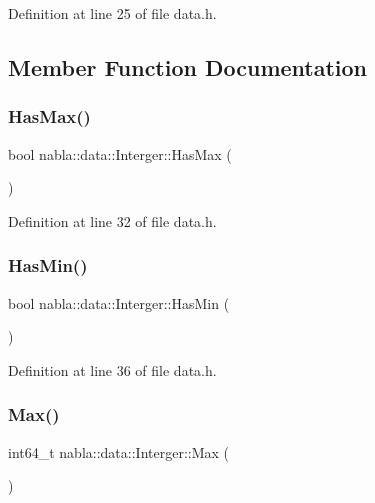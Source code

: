 Definition at line 25 of file data.\+h.



\subsection{Member Function Documentation}
\mbox{\label{classnabla_1_1data_1_1_interger_a626cb9b056389503fa1dff01c02ddb9f}} 
\subsubsection{\texorpdfstring{HasMax()}{HasMax()}}
{\footnotesize\ttfamily bool nabla\+::data\+::\+Interger\+::\+Has\+Max (\begin{DoxyParamCaption}{ }\end{DoxyParamCaption})\hspace{0.3cm}{\ttfamily [inline]}}



Definition at line 32 of file data.\+h.

\mbox{\label{classnabla_1_1data_1_1_interger_a0c41372880c86fc38f8a38f425f4153d}} 
\subsubsection{\texorpdfstring{HasMin()}{HasMin()}}
{\footnotesize\ttfamily bool nabla\+::data\+::\+Interger\+::\+Has\+Min (\begin{DoxyParamCaption}{ }\end{DoxyParamCaption})\hspace{0.3cm}{\ttfamily [inline]}}



Definition at line 36 of file data.\+h.

\mbox{\label{classnabla_1_1data_1_1_interger_aea133995f3dff9968a6043329f66363e}} 
\subsubsection{\texorpdfstring{Max()}{Max()}}
{\footnotesize\ttfamily int64\+\_\+t nabla\+::data\+::\+Interger\+::\+Max (\begin{DoxyParamCaption}{ }\end{DoxyParamCaption})\hspace{0.3cm}{\ttfamily [inline]}}



